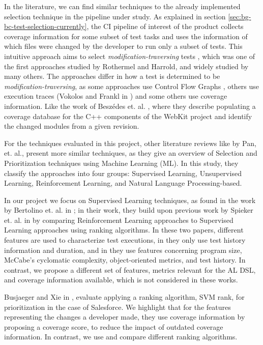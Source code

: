 In the literature, we can find similar techniques to the already implemented selection technique
in the pipeline under study. As explained in section \ref{sec:bg-bc-test-selection-currently},
the CI pipeline of interest of the product collects coverage information for some subset of test tasks and
uses the information of which files were changed by the developer to run only a subset of tests. This intuitive 
approach aims to select \emph{modification-traversing} tests \cite{536955}, 
which was one of the first approaches studied by Rothermel and Harrold, and widely studied by many others.
The approaches differ in how a test is determined to be \emph{modification-traversing}, 
as some approaches use Control Flow Graphs \cite{366926}, others use execution traces (Vokolos and Frankl in \cite{Vokolos1997PythiaAR})
and some others use coverage information. Like the work of Beszédes et. al. \cite{Beszdes2012CodeCR}, where they
describe populating a coverage database for the C++ components of the WebKit project
and identify the changed modules from a given revision.

For the techniques evaluated in this project, other literature reviews like \cite{Pan2021TestCS} by Pan, et. al.,
present more similar techniques, as they give an overview of Selection and Prioritization techniques
using Machine Learning (ML). In this study, they classify the approaches into four groups: Supervised
Learning, Unsupervised Learning, Reinforcement Learning, and Natural Language Processing-based.

In our project we focus on Supervised Learning techniques, as found in the work by Bertolino et. al. in 
\cite{Bertolino2020LearningtoRankVR}; in their work, they build upon previous work by Spieker et. al. in \cite{DBLP:journals/corr/abs-1811-04122}
by comparing Reinforcement Learning approaches to Supervised Learning approaches using ranking algorithms.
In these two papers, different features are used to characterize test executions, in \cite{DBLP:journals/corr/abs-1811-04122} 
they only use test history information and duration, and in \cite{Bertolino2020LearningtoRankVR} they use 
features concerning program size, McCabe's cyclomatic complexity, object-oriented metrics, and test history.
In contrast, we propose a different set of features, metrics relevant for the AL DSL, and coverage information
available, which is not considered in these works.

Busjaeger and Xie in \cite{Busjaeger2016LearningFT}, evaluate applying a ranking algorithm, SVM rank, for prioritization 
in the case of Salesforce. We highlight that for the features representing
the changes a developer made, they use coverage information by proposing a coverage score, to 
reduce the impact of outdated coverage information. In contrast, we use and compare different ranking algorithms.

